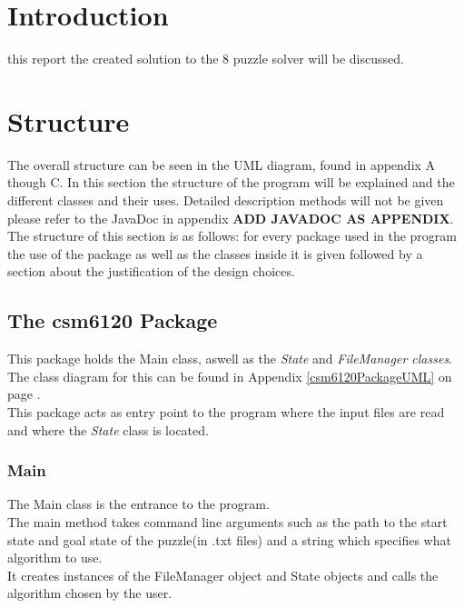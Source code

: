 \documentclass[journal]{IEEEtran}
\begin{document}
\section{Introduction}
% 
% 
% 
% 
 this report the  created solution to the 8 puzzle solver will be discussed.

\section{Structure}\label{sec:structure}
The overall structure can be seen in the UML diagram, found in appendix A though C.
In this section the structure of the program will be explained and the different classes and their uses. Detailed description methods will not be given please refer to the JavaDoc in appendix \textbf{ADD JAVADOC AS APPENDIX}.\\
The structure of this section is as follows: for every package used in the program the use of the package as well as the classes inside it is given followed by a section about the justification of the design choices. 

\subsection{The csm6120 Package}\label{sec:csm6120Package}
This package holds the Main class, aswell as the \textit{State} and \textit{FileManager classes}. \\
The class diagram for this can be found in Appendix \ref{csm6120PackageUML} on page \pageref{csm6120PackageUML}.\\
This package acts as entry point to the program where the input files are read and where the \textit{State} class is located. \\

\subsubsection{Main}
The Main class is the entrance to the program. \\
The main method takes command line arguments such as the path to the start state and goal state of the puzzle(in .txt files) and a string which specifies what algorithm to use. \\
It creates instances of the FileManager object and State objects and calls the algorithm chosen by the user.\\
\end{document}
